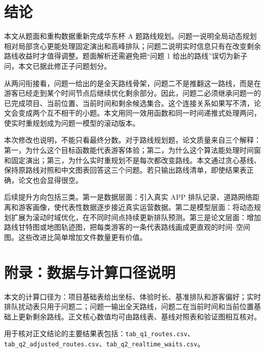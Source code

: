 \documentclass[UTF8,12pt,a4paper]{ctexart}
\begin{document}
\section{结论}

本文从题面和重构数据重新完成华东杯 A 题路线规划。问题一说明全局动态规划相对局部贪心更能处理固定演出和高峰排队；问题二说明实时信息只有在改变剩余路线收益时才值得调整。题面解析还需避免把“问题 1 给出的路线”误切为新子问，本文已据此修正子问题划分。

从两问衔接看，问题一给出的是全天路线骨架，问题二不是推翻这一路线，而是在游客已经走到某个时间节点后继续优化剩余部分。因此，问题二必须继承问题一的已完成项目、当前位置、当前时间和剩余候选集合。这个连接关系如果写不清，论文会变成两个互不相干的小题。本文用同一效用函数和同一时间递推式处理两问，使实时重规划成为问题一模型的滚动版本。

本次修改也说明，不能只看最终分数。对于路线规划题，论文质量来自三个解释：第一，为什么这个目标函数能代表游客体验；第二，为什么这个算法能处理时间窗和固定演出；第三，为什么实时重规划不是每次都改变路线。本文通过贪心基线、保持原路线对照和中文图表回答这三个问题。若只输出路线清单，即使结果表正确，论文也会显得很空。

后续提升方向包括三类。第一是数据层面：引入真实 APP 排队记录、道路网络距离和游客画像，使代表性数据逐步接近真实运营数据。第二是模型层面：将动态规划扩展为滚动时域优化，在不同时间点持续更新排队预测。第三是论文层面：增加路线甘特图或地图轨迹图，把每类游客的一条代表路线画成更直观的时间--空间图。这些改进比简单增加文件数量更有价值。

\appendix
\section{附录：数据与计算口径说明}

本文的计算口径为：项目基础表给出坐标、体验时长、基准排队和游客偏好；实时排队扰动表只用于问题二；问题一输出全天路线，问题二在当前时间和当前位置基础上更新剩余路线。正文核心数值均可由路线表、基线对照表和验证图相互核对。

用于核对正文结论的主要结果表包括：\verb|tab_q1_routes.csv|、\verb|tab_q2_adjusted_routes.csv|、\verb|tab_q2_realtime_waits.csv|。
\end{document}
